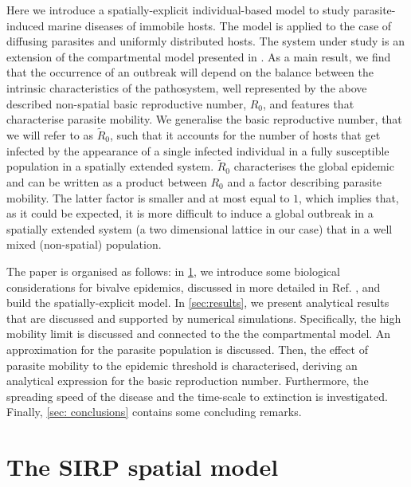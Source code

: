 Here we introduce a spatially-explicit individual-based model to study
parasite-induced marine diseases of immobile hosts. The model is applied  to
the case of diffusing parasites and uniformly distributed hosts. The system
under study is an extension of the compartmental model presented in
\cite{GimenezRomero2021}. As a main result, we find that the occurrence of an
outbreak will depend on the balance between the intrinsic characteristics of
the pathosystem, well represented by the above described non-spatial basic
reproductive number, $R_0$, and features that characterise parasite mobility.
We generalise the basic reproductive number, that we will refer to as
$\tilde{R}_0$, such that it accounts for the number of hosts that get infected
by the appearance of a single infected individual in a fully susceptible
population in a spatially extended system. $\tilde{R}_0$ characterises the
global epidemic and can be written as a product between $R_0$ and a factor
describing parasite mobility. The latter factor is smaller and at most equal to
$1$, which implies that, as it could be expected, it is more difficult to
induce a global outbreak in a spatially extended system (a two dimensional
lattice in our case) that in a well mixed (non-spatial) population.

The paper is organised as follows: in \cref{sec:model}, we introduce some
biological considerations for bivalve epidemics, discussed in more detailed in
Ref. \cite{GimenezRomero2021}, and build the spatially-explicit model. In
\cref{sec:results}, we present analytical results that are discussed and
supported by numerical simulations. Specifically, the high mobility limit is
discussed and connected to the the compartmental model. An approximation for
the parasite population is discussed. Then, the effect of parasite mobility to
the epidemic threshold is characterised, deriving an analytical expression for
the basic reproduction number. Furthermore, the spreading speed of the disease
and the time-scale to extinction is investigated. Finally, \cref{sec:
    conclusions} contains some concluding remarks.

\section{The SIRP spatial model} \label{sec:model}

